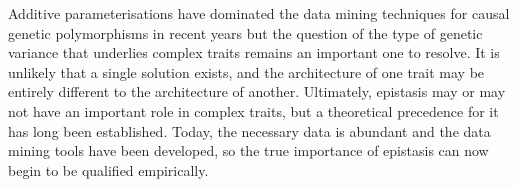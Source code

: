 Additive parameterisations have dominated the data mining techniques for causal genetic polymorphisms in recent years but the question of the type of genetic variance that underlies complex traits remains an important one to resolve. It is unlikely that a single solution exists, and the architecture of one trait may be entirely different to the architecture of another. Ultimately, epistasis may or may not have an important role in complex traits, but a theoretical precedence for it has long been established. Today, the necessary data is abundant and the data mining tools have been developed, so the true importance of epistasis can now begin to be qualified empirically.


